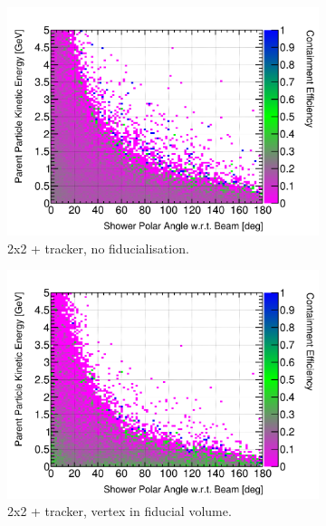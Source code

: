 \documentclass[10pt,a4paper,openany]{article}
\begin{document}
\begin{figure}[htbp]
\begin{subfigure}[b]{0.49\textwidth}
		\includegraphics[width=1.0\textwidth]{Pi0_cont_eff_2x2_Scintillator_gap.png}
		\caption{2x2 + tracker, no fiducialisation.}
		\label{}
	\end{subfigure}	
	\hfill
	\begin{subfigure}[b]{0.49\textwidth}
		\centering
		\includegraphics[width=1.0\textwidth]{Pi0_cont_eff_2x2_Scintillator_fiducial_gap.png}
		\caption{2x2 + tracker, vertex in fiducial volume.}
		\label{}
	\end{subfigure}
	\begin{subfigure}[b]{0.49\textwidth}
		\centering

\end{subfigure}
\end{figure}
\end{document}
